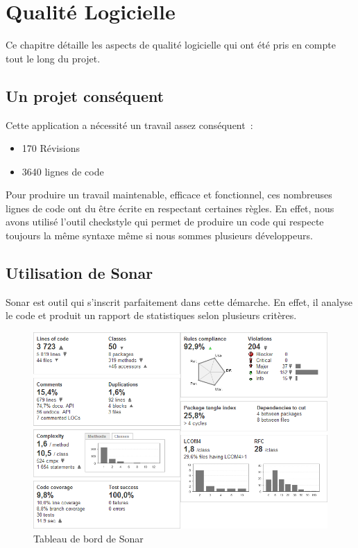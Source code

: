 \chapter{Qualité Logicielle}
\minitoc

Ce chapitre détaille les aspects de qualité logicielle qui ont été pris en compte tout le long du projet.

\section{Un projet conséquent}

Cette application a nécessité un travail assez conséquent~:

\begin{itemize}
\item 170 Révisions
\item 3640 lignes de code
\end{itemize}

Pour produire un travail maintenable, efficace et fonctionnel, ces nombreuses lignes de code ont du être 
écrite en respectant certaines règles. En effet, nous avons utilisé l'outil checkstyle qui permet de produire un code qui respecte toujours la même syntaxe même si nous sommes plusieurs développeurs.

\section{Utilisation de Sonar}
Sonar est outil qui s'inscrit parfaitement dans cette démarche. En effet, il analyse le code et produit un rapport de statistiques selon plusieurs critères.

\begin{figure}[!h]
 \centering
 \includegraphics[width=16cm]{images/sonar-dashboard.png} 
 \caption{Tableau de bord de Sonar}
 \label{fig:sonar-dashboard}
\end{figure}

